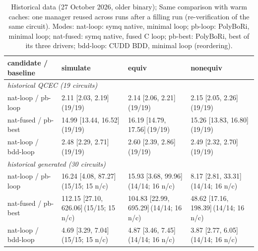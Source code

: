 \begin{table}[t]
\centering\scriptsize
\setlength{\tabcolsep}{4pt}
\caption{Historical data (27 October 2026, older binary); Same comparison with warm caches: one manager reused across runs after a filling run (re-verification of the same circuit). Modes: \textsf{nat-loop}: symq native, minimal loop; \textsf{pb-loop}: PolyBoRi, minimal loop; \textsf{nat-fused}: symq native, fused C loop; \textsf{pb-best}: PolyBoRi, best of its three drivers; \textsf{bdd-loop}: CUDD BDD, minimal loop (reordering).}
\label{tab:warm}
\begin{tabular}{llll}
\toprule
candidate / baseline & simulate & equiv & nonequiv \\
\midrule
\multicolumn{4}{l}{\emph{historical QCEC (19 circuits)}} \\
\textsf{nat-loop} / \textsf{pb-loop} & 2.11 [2.03, 2.19]\,{\scriptsize(19/19)} & 2.14 [2.06, 2.21]\,{\scriptsize(19/19)} & 2.15 [2.05, 2.26]\,{\scriptsize(19/19)} \\
\textsf{nat-fused} / \textsf{pb-best} & 14.99 [13.44, 16.52]\,{\scriptsize(19/19)} & 16.19 [14.79, 17.56]\,{\scriptsize(19/19)} & 15.26 [13.83, 16.80]\,{\scriptsize(19/19)} \\
\textsf{nat-loop} / \textsf{bdd-loop} & 2.48 [2.29, 2.71]\,{\scriptsize(19/19)} & 2.60 [2.39, 2.86]\,{\scriptsize(19/19)} & 2.49 [2.32, 2.70]\,{\scriptsize(19/19)} \\
\midrule
\multicolumn{4}{l}{\emph{historical generated (30 circuits)}} \\
\textsf{nat-loop} / \textsf{pb-loop} & 16.24 [4.08, 87.27]\,{\scriptsize(15/15; 15 n/c)} & 15.93 [3.68, 99.96]\,{\scriptsize(14/14; 16 n/c)} & 8.17 [2.81, 33.31]\,{\scriptsize(14/14; 16 n/c)} \\
\textsf{nat-fused} / \textsf{pb-best} & 112.15 [27.10, 626.06]\,{\scriptsize(15/15; 15 n/c)} & 104.83 [22.99, 695.29]\,{\scriptsize(14/14; 16 n/c)} & 48.62 [17.16, 198.39]\,{\scriptsize(14/14; 16 n/c)} \\
\textsf{nat-loop} / \textsf{bdd-loop} & 4.69 [3.29, 7.04]\,{\scriptsize(15/15; 15 n/c)} & 4.87 [3.46, 7.45]\,{\scriptsize(14/14; 16 n/c)} & 3.87 [2.77, 6.05]\,{\scriptsize(14/14; 16 n/c)} \\
\bottomrule
\end{tabular}
\end{table}

